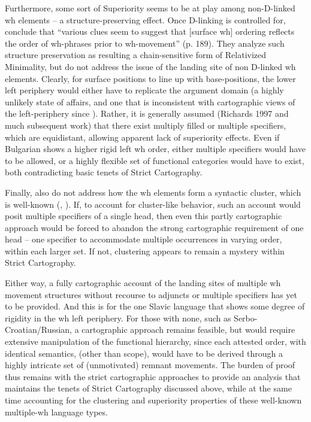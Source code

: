 \documentclass[output=paper]{langscibook}
\begin{document}
Furthermore, some sort of Superiority seems to be at play among non-D-linked wh elements – a structure-preserving effect. Once D-linking is controlled for, \citeauthor{KrapovaCinque2005} conclude that “various clues seem to suggest that [surface wh] ordering reflects the order of wh-phrases prior to wh-movement” (p. 189). They analyze such structure preservation as resulting a chain-sensitive form of Relativized Minimality, but do not address the issue of the landing site of non D-linked wh elements. Clearly, for surface positions to line up with base-positions, the lower left periphery would either have to replicate the argument domain (a highly unlikely state of affairs, and one that is inconsistent with cartographic views of the left-periphery since \citealt{rizzi1997}). Rather, it is generally assumed (Richards 1997 and much subsequent work) that there exist multiply filled or multiple specifiers, which are equidistant, allowing apparent lack of superiority effects. Even if Bulgarian shows a higher rigid left wh order, either multiple specifiers would have to be allowed, or a highly flexible set of functional categories would have to exist, both contradicting basic tenets of Strict Cartography.

Finally, \citet{KrapovaCinque2005} also do not address how the wh elements form a syntactic cluster, which is well-known (\citealt{Grewendorf2001}, \citealt{Bailyn2017}). If, to account for cluster-like behavior, such an account would posit multiple specifiers of a single head, then even this partly cartographic approach would be forced to abandon the strong cartographic requirement of one head -- one specifier to accommodate multiple occurrences in varying order, within each larger set. If not, clustering appears to remain a mystery within Strict Cartography.

Either way, a fully cartographic account of the landing sites of multiple wh movement structures without recourse to adjuncts or multiple specifiers has yet to be provided.  And this is for the one Slavic language that shows some degree of rigidity in the wh left periphery. For those with none, such as Serbo-Croatian/Russian, a cartographic approach remains feasible, but would require extensive manipulation of the functional hierarchy, since each attested order, with identical semantics, (other than scope), would have to be derived through a highly intricate set of (unmotivated) remnant movements. The burden of proof thus remains with the strict cartographic approaches to provide an analysis that maintains the tenets of Strict Cartography discussed above, while at the same time accounting for the clustering and superiority properties of these well-known multiple-wh language types.
\end{document}
